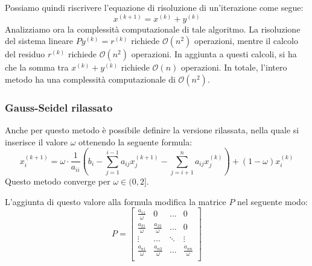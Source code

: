 Possiamo quindi riscrivere l'equazione di risoluzione di un'iterazione come segue:
\begin{equation*}
    x^{(k + 1)} = x^{(k)} + y^{(k)}
\end{equation*}
Analizziamo ora la complessità computazionale di tale algoritmo. La risoluzione
del sistema lineare $Py^{(k)} = r^{(k)}$ richiede $\mathcal{O}(n^2)$ operazioni,
mentre il calcolo del residuo $r^{(k)}$ richiede $\mathcal{O}(n^2)$ operazioni.
In aggiunta a questi calcoli, si ha che la somma tra $x^{(k)} + y^{(k)}$ richiede
$\mathcal{O}(n)$ operazioni. In totale, l'intero metodo ha una complessità
computazionale di $\mathcal{O}(n^2)$.
\subsubsection{Gauss-Seidel rilassato}
Anche per questo metodo è possibile definire la versione rilassata, nella quale
si inserisce il valore $\omega$ ottenendo la seguente formula:
\begin{equation*}
    x_i^{(k+1)} = \omega \cdot \frac{1}{a_{ii}}(b_i - \sum_{j = 1}^{i-1}a_{ij}x_j^{(k+1)} - \sum_{j = i+1}^{n}a_{ij}x_j^{(k)}) + (1-\omega)x_i^{(k)}
\end{equation*}
Questo metodo converge per $\omega \in (0,2]$.

L'aggiunta di questo valore alla formula modifica la matrice $P$ nel seguente modo:
\begin{equation*}
    P= \left[\begin{array}{cccc}
            \frac{a_{11}}{\omega} & 0                     & \dots  & 0                     \\
            \frac{a_{21}}{\omega} & \frac{a_{22}}{\omega} & \dots  & 0                     \\
            \vdots                & \dots                 & \ddots & \vdots                \\
            \frac{a_{n1}}{\omega} & \frac{a_{n2}}{\omega} & \dots  & \frac{a_{nn}}{\omega} \\
        \end{array}\right]
\end{equation*}

